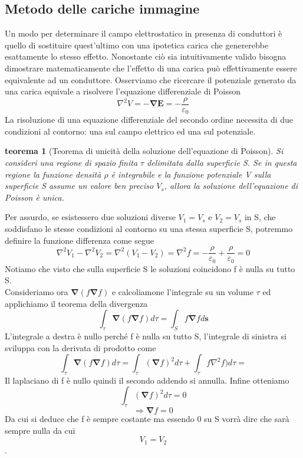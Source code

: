 \documentclass[10pt,a4paper]{article}
\newtheorem{teorema}{teorema}
\begin{document}
\subsection{Metodo delle cariche immagine}
Un modo per determinare il campo elettrostatico in presenza di conduttori è quello di sostituire quest'ultimo con una ipotetica carica che genererebbe esattamente lo stesso effetto. Nonostante ciò sia intuitivamente valido bisogna dimostrare matematicamente che l'effetto di una carica può effettivamente essere equivalente ad un conduttore. Osserviamo che ricercare il potenziale generato da una carica equivale a risolvere l'equazione differenziale di Poisson
\[{\nabla}^2 V = -\mathbf{\nabla}\mathbf{E}  = -\frac{\rho}{\varepsilon_0}\]
La risoluzione di una equazione differenziale del secondo ordine necessita di due condizioni al contorno: una sul campo elettrico ed una sul potenziale.
\begin{teorema}[Teorema di unicità della soluzione dell'equazione di Poisson]
	Si consideri una regione di spazio finita  \(\tau\)  delimitata dalla superficie S. Se in questa regione la funzione densità $\rho$ è integrabile e la funzione potenziale V sulla superficie S assume un valore ben preciso \(V_s\), allora la soluzione dell'equazione di Poisson è unica.
\end{teorema}
Per assurdo, se esistessero due soluzioni diverse \(V_1 = V_s\) e \(V_2 = V_s\) in S, che soddisfano le stesse condizioni al contorno su una stessa superficie S, potremmo definire la funzione differenza come segue
\[\nabla^2 V_1 - \nabla^2 V_2 = \nabla^2(V_1 - V_2) = \nabla^2 f = -\frac{\rho}{\varepsilon_0}+\frac{\rho}{\varepsilon_0}=0 \]
Notiamo che visto che sulla superficie S le soluzioni coincidono f è nulla su tutto S.\\
Consideriamo ora \(\mathbf{\nabla}(f\mathbf{\nabla}f)\) e calcoliamone l'integrale su un volume $\tau$ ed applichiamo il teorema della divergenza
\[\int_\tau \mathbf{\nabla}(f\mathbf{\nabla}f)d\tau= \int_Sf\mathbf{\nabla}fd\mathbf{s}\]
L'integrale a destra è nullo perché f è nulla su tutto S, l'integrale di sinistra si sviluppa con la derivata di prodotto come
\[\int_\tau \mathbf{\nabla}(f\mathbf{\nabla}f)d\tau = \int_\tau (\mathbf{\nabla}f )^2 d\tau + \int_\tau f{\nabla}^2f)d\tau = \]
Il laplaciano di f è nullo quindi il secondo addendo si annulla. Infine otteniamo
\[\int_\tau (\mathbf{\nabla}f )^2 d\tau=0\]
\[\Rightarrow \mathbf{\nabla}f = 0\]
Da cui si deduce che f è sempre costante ma essendo 0 su S vorrà dire che sarà sempre nulla da cui \[V_1 = V_2\]. 
\\\\
\end{document}
